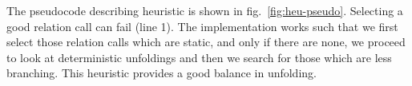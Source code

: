 
The pseudocode describing heuristic is shown in fig.~\ref{fig:heu-pseudo}.
Selecting a good relation call can fail (line 1).
The implementation works such that we first select those relation calls which are static, and only if there are none, we proceed to look at deterministic unfoldings and then we search for those which are less branching.
This heuristic provides a good balance in unfolding.



